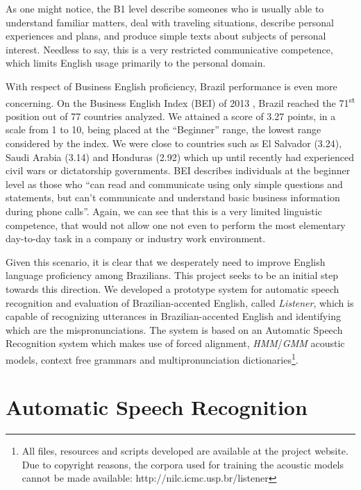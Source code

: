 \documentclass[twocolumn]{bmcart}%
\begin{document}
As one might notice,  the B1 level describe someones who is usually able to understand familiar matters, deal with traveling situations, describe personal experiences and plans, and produce simple texts about subjects of personal interest. Needless to say, this is a very restricted communicative competence, which limits English usage primarily to the personal domain. 

With respect of Business English proficiency, Brazil performance is even more concerning. On the 
Business English Index (BEI) of 2013 \cite{BEI2013}, Brazil reached the 71\textsuperscript{st} position out of 77 countries analyzed. We attained a score of 3.27 points, in a scale from 1 to 10, being placed at the ``Beginner'' range, the lowest range considered by the index. We were close to countries such as El Salvador (3.24), Saudi Arabia (3.14) and Honduras (2.92) which up until recently had experienced civil wars or dictatorship governments. BEI describes individuals at the beginner level as those who ``can read and communicate using only simple questions and statements, but can't communicate and understand basic business information during phone calls''. Again, we can see that this is a very limited linguistic competence, that would not allow one not even to perform the most elementary day-to-day task in a company or industry work environment.

Given this scenario, it is clear that we desperately need to improve English language proficiency among Brazilians. This project seeks to be an initial step towards this direction. We developed a prototype system for automatic speech recognition and evaluation of Brazilian-accented English, called \emph{Listener}, which is capable of recognizing utterances in Brazilian-accented English and identifying which are the mispronunciations. The system is based on an Automatic Speech Recognition system which makes use of forced alignment, \emph{HMM}/\emph{GMM} acoustic models, context free grammars and multipronunciation dictionaries\footnote{All files, resources and scripts developed are available at the project website. Due to copyright reasons, the corpora used for training the acoustic models cannot be made available: http://nilc.icmc.usp.br/listener}.

\section*{Automatic Speech Recognition}\label{sec:speech-recognition}
\end{document}
